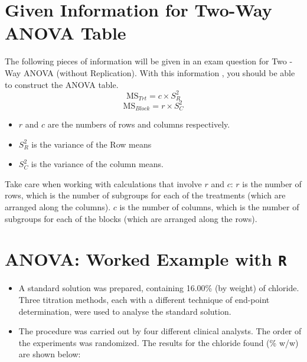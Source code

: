 \documentclass[12pt]{article}
\begin{document}
\section*{Given Information for Two-Way ANOVA Table}
The following pieces of information will be given in an exam question for Two -Way ANOVA (without Replication). With this information , you should be able to construct the ANOVA table.
	\[ \mbox{MS}_{Trt} = c \times S^2_{R}\]
	\[ \mbox{MS}_{Block} = r \times S^2_{C}\]

	\begin{itemize}
		\item $r$ and $c$ are the numbers of rows and columns respectively.
		\item $S^2_{R}$ is the variance of the Row means 
		\item $S^2_{C}$ is the variance of the column means.
	\end{itemize}
	
	Take care when working with calculations that involve $r$ and $c$: 
	$r$ is the number of rows, which is the number of subgroups for each of the treatments (which are arranged along the columns).
	$c$ is the number of columns, which is the number of subgroups for each of the blocks (which are arranged along the rows).
	
\section*{ANOVA: Worked Example with \texttt{R}}
\begin{itemize}
	\item A standard solution was prepared, containing 16.00\% (by weight) of chloride. Three titration methods, each with a different technique of end-point determination, were used to analyse the standard solution.
	\item The procedure was carried out by four different clinical analysts. The order of the experiments was randomized. The results for the chloride found (\% w/w) are shown below:
	
\end{itemize}
\end{document}

